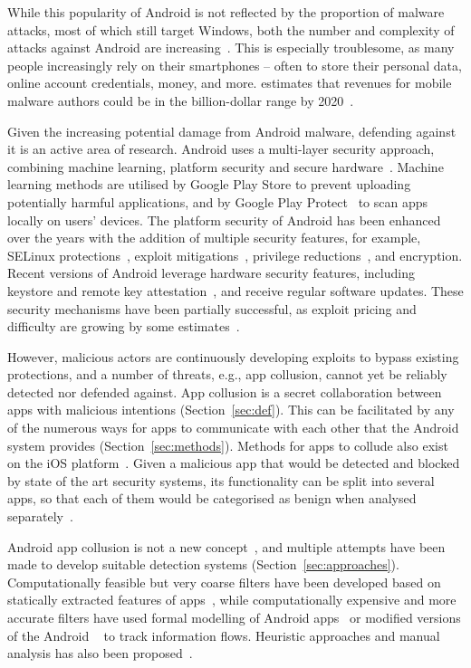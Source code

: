 \documentclass[article]{aaltoseries}
\newcommand{\Sref}[1]{Section~\ref{#1}}
\renewcommand\gls\cgls
\begin{document}
While this popularity of Android is not reflected by the proportion of malware attacks, most of which still target Windows, both the number and complexity of attacks against Android are increasing~\cite{AVTESTGH2018}. This is especially troublesome, as many people increasingly rely on their smartphones -- often to store their personal data, online account credentials, money, and more. \citeauthor{McAfee2018} estimates that revenues for mobile malware authors could be in the billion-dollar range by 2020~\cite{McAfee2018}.

Given the increasing potential damage from Android malware, defending against it is an active area of research. Android uses a multi-layer security approach, combining machine learning, platform security and secure hardware~\cite{AOSP2018}. Machine learning methods are utilised by Google Play Store to prevent uploading potentially harmful applications, and by Google Play Protect~\cite{AOSPplayprotect} to scan apps locally on users' devices. The platform security of Android has been enhanced over the years with the addition of multiple security features, for example, SELinux protections~\cite[\href{https://source.android.com/security/selinux}{``Security-Enhanced Linux in Android''}]{AOSPsecurity}, exploit mitigations~\cite{Edge2016}, privilege reductions~\cite{Lawrence2017}, and encryption. Recent versions of Android leverage hardware security features, including keystore and remote key attestation~\cite{Willden2017}, and receive regular software updates. These security mechanisms have been partially successful, as exploit pricing and difficulty are growing by some estimates~\cite{AOSP2018}.

However, malicious actors are continuously developing exploits to bypass existing protections, and a number of threats, e.g., app collusion, cannot yet be reliably detected nor defended against. App collusion is a secret collaboration between apps with malicious intentions (\Sref{sec:def}). This can be facilitated by any of the numerous ways for apps to communicate with each other that the Android system provides (\Sref{sec:methods}). Methods for apps to collude also exist on the iOS platform~\cite{Deshotels2016}. Given a malicious app that would be detected and blocked by state of the art security systems, its functionality can be split into several apps, so that each of them would be categorised as benign when analysed separately~\cite{Chen2018}.

Android app collusion is not a new concept~\cite{Schlegel2011}, and multiple attempts have been made to develop suitable detection systems (\Sref{sec:approaches}). Computationally feasible but very coarse filters have been developed based on statically extracted features of apps~\cite{Asavoae2016, Chen2018}, while computationally expensive and more accurate filters have used formal modelling of Android apps~\cite{Asavoae2018} or modified versions of the Android \gls{os}~\cite{Enck2014} to track information flows. Heuristic approaches and manual analysis has also been proposed~\cite{Muttik2016}.
\end{document}
